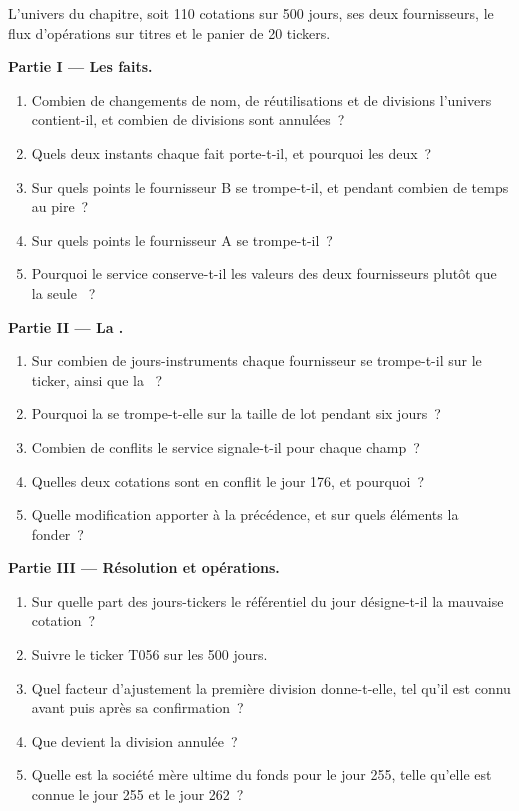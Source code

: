 \begin{problem}\label{pb:pl:reference-data-and-symbology-services:1}
L'univers du chapitre, soit 110 cotations sur 500 jours, ses deux fournisseurs, le flux d'opérations sur titres et le panier de 20 tickers.

\medskip\noindent\textbf{Partie I --- Les faits.}
\begin{enumerate}
\item Combien de changements de nom, de réutilisations et de divisions l'univers contient-il, et combien de divisions sont annulées~?
\item Quels deux instants chaque fait porte-t-il, et pourquoi les deux~?
\item Sur quels points le fournisseur B se trompe-t-il, et pendant combien de temps au pire~?
\item Sur quels points le fournisseur A se trompe-t-il~?
\item Pourquoi le service conserve-t-il les valeurs des deux fournisseurs plutôt que la seule ~?
\end{enumerate}

\medskip\noindent\textbf{Partie II --- La .}
\begin{enumerate}[resume]
\item Sur combien de jours-instruments chaque fournisseur se trompe-t-il sur le ticker, ainsi que la ~?
\item Pourquoi la  se trompe-t-elle sur la taille de lot pendant six jours~?
\item Combien de conflits le service signale-t-il pour chaque champ~?
\item Quelles deux cotations sont en conflit le jour 176, et pourquoi~?
\item Quelle modification apporter à la précédence, et sur quels éléments la fonder~?
\end{enumerate}

\medskip\noindent\textbf{Partie III --- Résolution et opérations.}
\begin{enumerate}[resume]
\item Sur quelle part des jours-tickers le référentiel du jour désigne-t-il la mauvaise cotation~?
\item Suivre le ticker T056 sur les 500 jours.
\item Quel facteur d'ajustement la première division donne-t-elle, tel qu'il est connu avant puis après sa confirmation~?
\item Que devient la division annulée~?
\item Quelle est la société mère ultime du fonds pour le jour 255, telle qu'elle est connue le jour 255 et le jour 262~?
\end{enumerate}


\end{problem}
